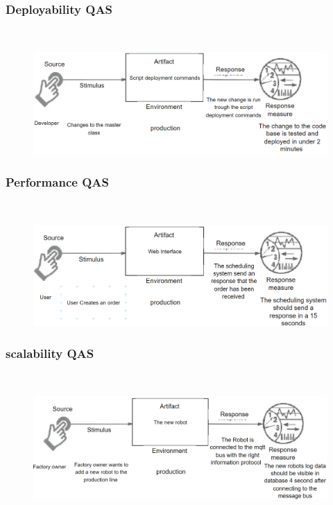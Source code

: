 \subsubsection{Deployability QAS}
\label{sec:deployqas}
\textcolor{white}{somting}
\begin{figure}[H]
    \centering
    \includegraphics[width=0.8\linewidth]{Images/Deployability.png}
    \label{fig:deployability}
\end{figure}

\subsubsection{Performance QAS}
\label{sec:performanceqas}
\textcolor{white}{somting}
\begin{figure}[H]
    \centering
    \includegraphics[width=0.8\linewidth]{Images/Performance.png}
    \label{fig:performance}
\end{figure}

\subsubsection{scalability QAS}
\label{sec:scalabilityqas}
\textcolor{white}{somting}
\begin{figure}[H]
    \centering
    \includegraphics[width=0.8\linewidth]{Images/scalability.png}
    \label{fig:scalability}
\end{figure}

